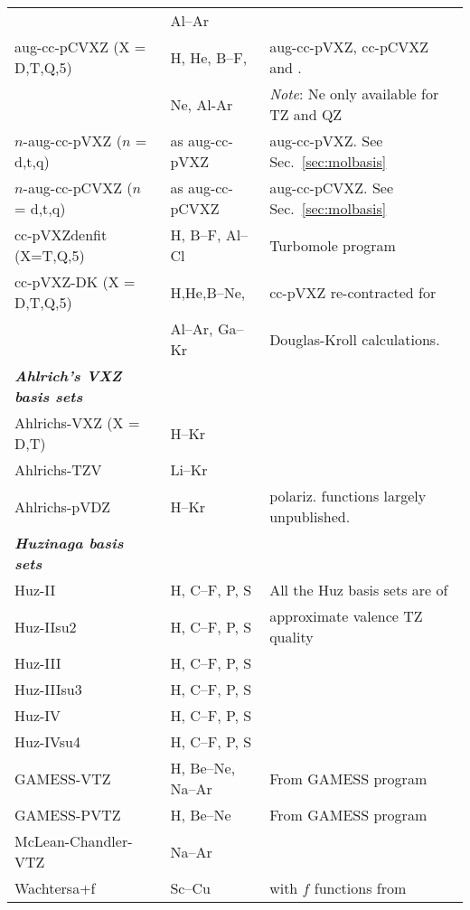\begin{longtable}{lll}
  & Al--Ar & \\
aug-cc-pCVXZ (X = D,T,Q,5) & H, He, B--F, & aug-cc-pVXZ, cc-pCVXZ and \cite{idewthdjcp103,kapthdjcp117}.\\
  & Ne, Al-Ar & \emph{Note}: Ne only available for TZ and QZ \\
$n$-aug-cc-pVXZ ($n$ = d,t,q) & as aug-cc-pVXZ & aug-cc-pVXZ. See Sec.~\ref{sec:molbasis} \\
$n$-aug-cc-pCVXZ ($n$ = d,t,q) & as aug-cc-pCVXZ & aug-cc-pCVXZ. See Sec.~\ref{sec:molbasis} \\
\hline
cc-pVXZdenfit (X=T,Q,5) & H, B--F, Al--Cl & Turbomole program \\
cc-pVXZ-DK (X = D,T,Q,5) & H,He,B--Ne, & \cite{thdjcp90,dewthdjcp100,dewthdjcp98,akwdewkapthdjcp110} 
  cc-pVXZ re-contracted for \\
  & Al--Ar, Ga--Kr & Douglas-Kroll calculations.\\
\hline
\newpage
\bf{\emph{Ahlrich's VXZ basis sets}} & & \\
Ahlrichs-VXZ (X = D,T) & H--Kr & \cite{ashhrajcp97}\\
Ahlrichs-TZV & Li--Kr & \cite{aschrajcp100} \\
Ahlrichs-pVDZ & H--Kr & \cite{ashhrajcp97} polariz. functions largely unpublished.\\
%
\bf{\emph{Huzinaga basis sets}} & & \\
Huz-II & H, C--F, P, S & \cite{wkijc19,mswkjcp76,huzinagaintern} All the Huz basis sets are of\\
Huz-IIsu2 & H, C--F, P, S & \cite{wkijc19,mswkjcp76,huzinagaintern} approximate valence TZ quality\\
Huz-III & H, C--F, P, S & \cite{wkijc19,mswkjcp76,huzinagaintern} \\
Huz-IIIsu3 & H, C--F, P, S & \cite{wkijc19,mswkjcp76,huzinagaintern}\\
Huz-IV & H, C--F, P, S & \cite{wkijc19,mswkjcp76,huzinagaintern}\\
Huz-IVsu4 & H, C--F, P, S & \cite{wkijc19,mswkjcp76,huzinagaintern}\\
\hline
GAMESS-VTZ & H, Be--Ne, Na--Ar & \cite{thdjcp55,admgscjcp72,ajhwjcp52} From GAMESS program \\
GAMESS-PVTZ & H, Be--Ne & \cite{thdjcp55,admgscjcp72,ajhwjcp52} From GAMESS program \\
%
McLean-Chandler-VTZ & Na--Ar & \cite{admgscjcp72} \\
Wachtersa+f & Sc--Cu & \cite{ajhwjcp52,wachterintern1969} with $f$ functions from \cite{cwbsrllabjcp91} \\

\end{longtable}
